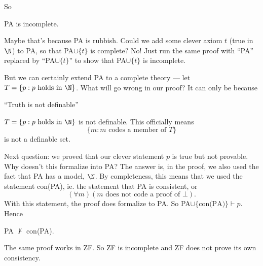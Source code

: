 \documentclass[a4paper]{article}
\begin{document}
So
\begin{thm}
  PA is incomplete.
\end{thm}

Maybe that's because PA is rubbish. Could we add some clever axiom $t$ (true in $\N$) to PA, so that PA$\cup \{t\}$ is complete? No! Just run the same proof with ``PA'' replaced by ``PA$\cup \{t\}$'' to show that PA$\cup\{t\}$ is incomplete.

But we can certainly extend PA to a complete theory --- let $T = \{p: p\text{ holds in }\N\}$. What will go wrong in our proof? It can only be because
\begin{thm}
  ``Truth is not definable''

  $T= \{p: p\text{ holds in }\N\}$ is not definable. This officially means
  \[
    \{m: m\text{ codes a member of }T\}
  \]
  is not a definable set.
\end{thm}

Next question: we proved that our clever statement $p$ is true but not provable. Why doesn't this formalize into PA? The answer is, in the proof, we also used the fact that PA has a model, $\N$. By completeness, this means that we used the statement con(PA), ie. the statement that PA is consistent, or
\[
  (\forall m)(m\text{ does not code a proof of }\bot).
\]
With this statement, the proof does formalize to PA. So PA$\cup \{\text{con(PA)}\}\vdash p$. Hence
\begin{thm}
  PA $\not \vdash$ con(PA).
\end{thm}

The same proof works in ZF. So ZF is incomplete and ZF does not prove its own consistency.

\printindex
\end{document}
